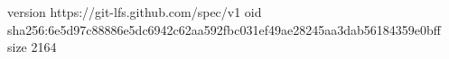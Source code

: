 version https://git-lfs.github.com/spec/v1
oid sha256:6e5d97c88886e5dc6942c62aa592fbc031ef49ae28245aa3dab56184359e0bff
size 2164
